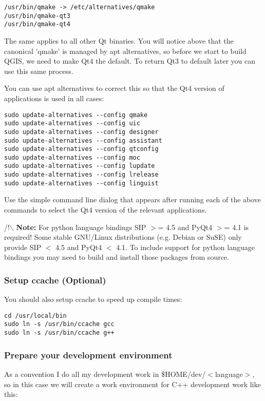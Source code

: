\begin{verbatim}
/usr/bin/qmake -> /etc/alternatives/qmake 
/usr/bin/qmake-qt3
/usr/bin/qmake-qt4 
\end{verbatim}

The same applies to all other Qt binaries. You will notice above that the
canonical 'qmake' is managed by apt alternatives, so before we start to
build QGIS, we need to make Qt4 the default. To return Qt3 to default later
you can use this same process.

You can use apt alternatives to correct this so that the Qt4 version of
applications is used in all cases:

\begin{verbatim}
sudo update-alternatives --config qmake
sudo update-alternatives --config uic 
sudo update-alternatives --config designer 
sudo update-alternatives --config assistant 
sudo update-alternatives --config qtconfig 
sudo update-alternatives --config moc 
sudo update-alternatives --config lupdate 
sudo update-alternatives --config lrelease 
sudo update-alternatives --config linguist 
\end{verbatim}

Use the simple command line dialog that appears after running each of the
above commands to select the Qt4 version of the relevant applications.

/!$\backslash$ \textbf{Note:} For python language bindings SIP $>$= 4.5 and PyQt4 $>$= 4.1 is required! Some stable GNU/Linux
distributions (e.g. Debian or SuSE) only provide SIP $<$ 4.5 and PyQt4 $<$ 4.1. To include support for python 
language bindings you may need to build and install those packages from source.

\hypertarget{toc7}{}
\subsubsection{Setup ccache (Optional)}
You should also setup ccache to speed up compile times:

\begin{verbatim}
cd /usr/local/bin 
sudo ln -s /usr/bin/ccache gcc 
sudo ln -s /usr/bin/ccache g++ 
\end{verbatim}

\hypertarget{toc8}{}
\subsubsection{Prepare your development environment}
As a convention I do all my development work in \$HOME/dev/$<$language$>$, so in
this case we will create a work environment for C++ development work like
this:

